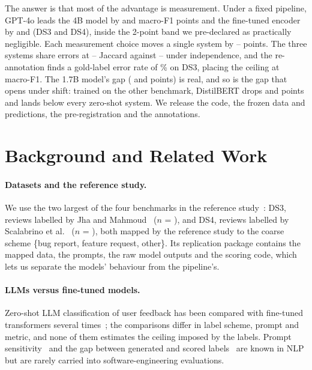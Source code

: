 \documentclass[sigconf,anonymous,review]{acmart}
\newcommand{\fone}{macro-F1\xspace}
\begin{document}
The answer is that most of the advantage is measurement. Under a fixed pipeline, GPT-4o leads the 4B model by \gapQfourDSthree{} and \gapQfourDSfour{} \fone points and the fine-tuned encoder by \gapDbDSthree{} and \gapDbDSfour{} (DS3 and DS4), inside the 2-point band we pre-declared as practically negligible. Each measurement choice moves a single system by \artMin--\artMax{} points. The three systems share errors at \jMinDSfour--\jMaxDSthree{} Jaccard against \jNullDSfour--\jNullDSthree{} under independence, and the re-annotation finds a gold-label error rate of \epsDSthree\% on DS3, placing the ceiling at \ceilingDSthree{} \fone. The 1.7B model's gap (\gapQseventeenDSthree{} and \gapQseventeenDSfour{} points) is real, and so is the gap that opens under shift: trained on the other benchmark, DistilBERT drops \dropDSthreeToDSfour{} and \dropDSfourToDSthree{} points and lands below every zero-shot system. We release the code, the frozen data and predictions, the pre-registration and the annotations.

\section{Background and Related Work}

\paragraph{Datasets and the reference study.} We use the two largest of the four benchmarks in the reference study~\cite{abedini2025}: DS3, reviews labelled by Jha and Mahmoud~\cite{jha2018} ($n$ = \nDSthree), and DS4, reviews labelled by Scalabrino et al.~\cite{scalabrino2019} ($n$ = \nDSfour), both mapped by the reference study to the coarse scheme \{bug report, feature request, other\}. Its replication package contains the mapped data, the prompts, the raw model outputs and the scoring code, which lets us separate the models' behaviour from the pipeline's.

\paragraph{LLMs versus fine-tuned models.} Zero-shot LLM classification of user feedback has been compared with fine-tuned transformers several times~\cite{abedini2025,mallya2025}; the comparisons differ in label scheme, prompt and metric, and none of them estimates the ceiling imposed by the labels. Prompt sensitivity~\cite{sclar2024,mizrahi2024} and the gap between generated and scored labels~\cite{holtzman2021} are known in NLP but are rarely carried into software-engineering evaluations.
\end{document}
